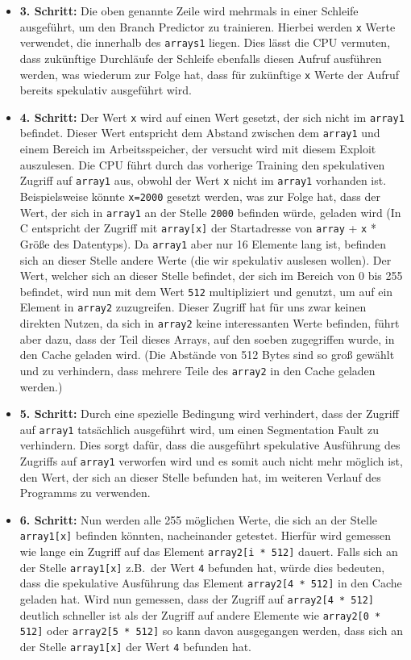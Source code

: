 \begin{itemize}
    \item \textbf{3. Schritt:} Die oben genannte Zeile wird mehrmals in einer Schleife ausgeführt, um den Branch Predictor zu trainieren.
    Hierbei werden \texttt{x} Werte verwendet, die innerhalb des \texttt{arrays1} liegen.
    Dies lässt die CPU vermuten, dass zukünftige Durchläufe der Schleife ebenfalls diesen Aufruf ausführen werden, was wiederum zur Folge hat, dass für zukünftige \texttt{x} Werte der Aufruf bereits spekulativ ausgeführt wird.
    \item \textbf{4. Schritt:} Der Wert \texttt{x} wird auf einen Wert gesetzt, der sich nicht im \texttt{array1} befindet.
    Dieser Wert entspricht dem Abstand zwischen dem \texttt{array1} und einem Bereich im Arbeitsspeicher, der versucht wird mit diesem Exploit auszulesen.
    Die CPU führt durch das vorherige Training den spekulativen Zugriff auf \texttt{array1} aus, obwohl der Wert \texttt{x} nicht im \texttt{array1} vorhanden ist.
    Beispielsweise könnte \texttt{x=2000} gesetzt werden, was zur Folge hat, dass der Wert, der sich in \texttt{array1} an der Stelle \texttt{2000} befinden würde, geladen wird (In C entspricht der Zugriff mit \texttt{array[x]} der Startadresse von \texttt{array} + \texttt{x} * Größe des Datentyps).
    Da \texttt{array1} aber nur 16 Elemente lang ist, befinden sich an dieser Stelle andere Werte (die wir spekulativ auslesen wollen).
    Der Wert, welcher sich an dieser Stelle befindet, der sich im Bereich von 0 bis 255 befindet, wird nun mit dem Wert \texttt{512} multipliziert und genutzt, um auf ein Element in \texttt{array2} zuzugreifen.
    Dieser Zugriff hat für uns zwar keinen direkten Nutzen, da sich in \texttt{array2} keine interessanten Werte befinden, führt aber dazu, dass der Teil dieses Arrays, auf den soeben zugegriffen wurde, in den Cache geladen wird.
    (Die Abstände von 512 Bytes sind so groß gewählt und zu verhindern, dass mehrere Teile des \texttt{array2} in den Cache geladen werden.)
    \item \textbf{5. Schritt:} Durch eine spezielle Bedingung wird verhindert, dass der Zugriff auf \texttt{array1} tatsächlich ausgeführt wird, um einen Segmentation Fault zu verhindern.
    Dies sorgt dafür, dass die ausgeführt spekulative Ausführung des Zugriffs auf \texttt{array1} verworfen wird und es somit auch nicht mehr möglich ist, den Wert, der sich an dieser Stelle befunden hat, im weiteren Verlauf des Programms zu verwenden.
    \item \textbf{6. Schritt:} Nun werden alle 255 möglichen Werte, die sich an der Stelle \texttt{array1[x]} befinden könnten, nacheinander getestet.
    Hierfür wird gemessen wie lange ein Zugriff auf das Element \texttt{array2[i * 512]} dauert.
    Falls sich an der Stelle \texttt{array1[x]} z.B.~der Wert \texttt{4} befunden hat, würde dies bedeuten, dass die spekulative Ausführung das Element \texttt{array2[4 * 512]} in den Cache geladen hat.
    Wird nun gemessen, dass der Zugriff auf \texttt{array2[4 * 512]} deutlich schneller ist als der Zugriff auf andere Elemente wie \texttt{array2[0 * 512]} oder \texttt{array2[5 * 512]} so kann davon ausgegangen werden, dass sich an der Stelle \texttt{array1[x]} der Wert \texttt{4} befunden hat.
\end{itemize}